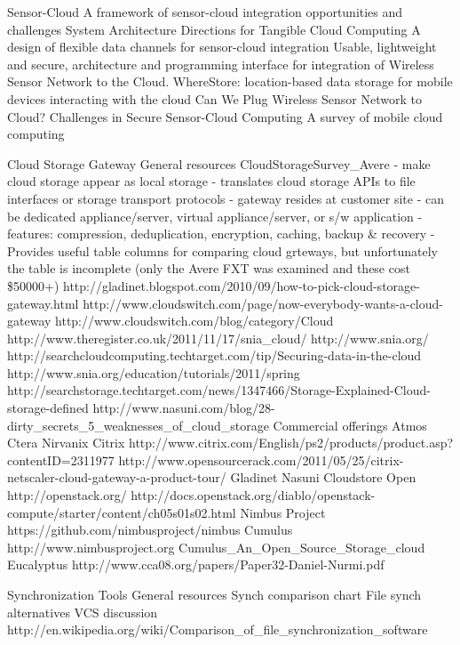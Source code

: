 		Sensor-Cloud
			A framework of sensor-cloud integration opportunities and challenges
			System Architecture Directions for Tangible Cloud Computing
			A design of flexible data channels for sensor-cloud integration
			Usable, lightweight and secure, architecture and programming interface for integration of Wireless Sensor Network to the Cloud.
			WhereStore: location-based data storage for mobile devices interacting with the cloud
			Can We Plug Wireless Sensor Network to Cloud?
			Challenges in Secure Sensor-Cloud Computing
			A survey of mobile cloud computing
			
	Cloud Storage Gateway
		General resources
			CloudStorageSurvey_Avere
				- make cloud storage appear as local storage
				- translates cloud storage APIs to file interfaces or storage transport protocols
				- gateway resides at customer site
					- can be dedicated appliance/server, virtual appliance/server, or s/w application
						- features: compression, deduplication, encryption, caching, backup & recovery
				- Provides useful table columns for comparing cloud grteways, but unfortunately the table is incomplete (only the Avere FXT was examined and these cost \$50000+)		
			http://gladinet.blogspot.com/2010/09/how-to-pick-cloud-storage-gateway.html 
			http://www.cloudswitch.com/page/now-everybody-wants-a-cloud-gateway
			http://www.cloudswitch.com/blog/category/Cloud%
			http://www.theregister.co.uk/2011/11/17/snia_cloud/
			http://www.snia.org/
			http://searchcloudcomputing.techtarget.com/tip/Securing-data-in-the-cloud 
			http://www.snia.org/education/tutorials/2011/spring
			http://searchstorage.techtarget.com/news/1347466/Storage-Explained-Cloud-storage-defined
			http://www.nasuni.com/blog/28-dirty_secrets_5_weaknesses_of_cloud_storage 
		Commercial offerings
			Atmos 
			Ctera
			Nirvanix 
			Citrix
			http://www.citrix.com/English/ps2/products/product.asp?contentID=2311977
			http://www.opensourcerack.com/2011/05/25/citrix-netscaler-cloud-gateway-a-product-tour/
			Gladinet 
			Nasuni
			Cloudstore 
		Open
			http://openstack.org/
				http://docs.openstack.org/diablo/openstack-compute/starter/content/ch05s01s02.html 
			Nimbus Project
				https://github.com/nimbusproject/nimbus
			Cumulus
				http://www.nimbusproject.org	
				Cumulus_An_Open_Source_Storage_cloud
			Eucalyptus
				http://www.cca08.org/papers/Paper32-Daniel-Nurmi.pdf		

	Synchronization Tools
		General resources
			Synch comparison chart 
			File synch alternatives 
			VCS discussion
			http://en.wikipedia.org/wiki/Comparison_of_file_synchronization_software
		
